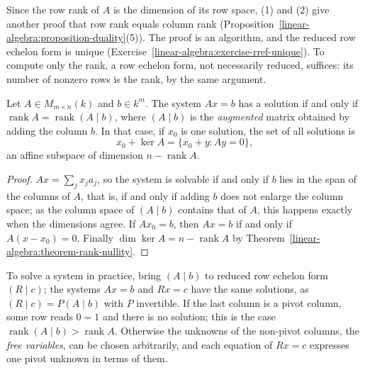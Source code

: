 Since the row rank of $A$ is the dimension of its row space, (1) and (2) give another proof that row rank equals column rank (Proposition~\ref{linear-algebra:proposition-duality}(5)). The proof is an
algorithm, and the reduced row echelon form is unique (Exercise~\ref{linear-algebra:exercise-rref-unique}). To compute only the rank, a row echelon form, not necessarily reduced, suffices: its
number of nonzero rows is the rank, by the same argument.

\begin{theorem}\label{linear-algebra:theorem-rouche-capelli}
Let $A \in M_{m \times n}(k)$ and $b \in k^m$. The system $Ax = b$ has a solution if and only if $\operatorname{rank}A = \operatorname{rank}(A \mid b)$, where $(A \mid b)$ is the \emph{augmented} matrix
obtained by adding the column $b$. In that case, if $x_0$ is one solution, the set of all solutions is
\[
x_0 + \ker A = \{x_0 + y : Ay = 0\},
\]
an affine subspace of dimension $n - \operatorname{rank}A$.
\end{theorem}

\begin{proof}
$Ax = \sum_jx_ja_j$, so the system is solvable if and only if $b$ lies in the span of the columns of $A$, that is, if and only if adding $b$ does not enlarge the column space; as the column space of
$(A \mid b)$ contains that of $A$, this happens exactly when the dimensions agree. If $Ax_0 = b$, then $Ax = b$ if and only if $A(x - x_0) = 0$. Finally $\dim\ker A = n - \operatorname{rank}A$ by
Theorem~\ref{linear-algebra:theorem-rank-nullity}.
\end{proof}

To solve a system in practice, bring $(A \mid b)$ to reduced row echelon form $(R \mid c)$; the systems $Ax = b$ and $Rx = c$ have the same solutions, as $(R \mid c) = P(A \mid b)$ with $P$ invertible. If the
last column is a pivot column, some row reads $0 = 1$ and there is no solution; this is the case $\operatorname{rank}(A \mid b) > \operatorname{rank}A$. Otherwise the unknowns of the non-pivot columns, the
\emph{free variables}, can be chosen arbitrarily, and each equation of $Rx = c$ expresses one pivot unknown in terms of them.

